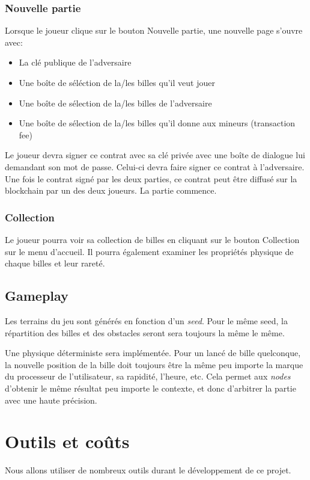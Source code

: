 \documentclass{article}
\begin{document}
\subsubsection{Nouvelle partie}
Lorsque le joueur clique sur le bouton Nouvelle partie, une nouvelle page s'ouvre avec:
\begin{itemize}
    \item La clé publique de l'adversaire
    \item Une boîte de séléction de la/les billes qu'il veut jouer
    \item Une boîte de sélection de la/les billes de l'adversaire
    \item Une boîte de sélection de la/les billes qu'il donne aux mineurs (transaction fee)
\end{itemize}

Le joueur devra signer ce contrat avec sa clé privée avec une boîte de dialogue lui demandant son mot de passe. Celui-ci devra faire signer ce contrat à l'adversaire. Une fois le contrat signé par les deux parties, ce contrat peut être diffusé sur la blockchain par un des deux joueurs. La partie commence.

\subsubsection{Collection}
Le joueur pourra voir sa collection de billes en cliquant sur le bouton Collection sur le menu d'accueil. Il pourra également examiner les propriétés physique de chaque billes et leur rareté.

\subsection{Gameplay}
Les terrains du jeu sont générés en fonction d'un \textit{seed}. Pour le même seed, la répartition des billes et des obstacles seront sera toujours la même le même.

Une physique déterministe sera implémentée. Pour un lancé de bille quelconque, la nouvelle position de la bille doit toujours être la même peu importe la marque du processeur de l'utilisateur, sa rapidité, l'heure, etc. Cela permet aux \textit{nodes} d'obtenir le même résultat peu importe le contexte, et donc d'arbitrer la partie avec une haute précision.


\section{Outils et coûts}
Nous allons utiliser de nombreux outils durant le développement de ce projet.
\end{document}
